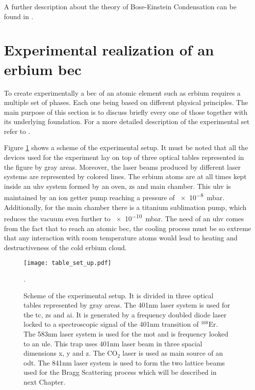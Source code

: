 A further description about the theory of Bose-Einstein Condensation can be found in \cite{Masahito2010, Pethick2008}.

\section{Experimental realization of an erbium \ac{bec}} \label{sec:experimental_preparation}

To create experimentally a \ac{bec} of an atomic element such as erbium requires a multiple set of phases. Each one being based on different physical principles. The main purpose of this section is to discuss briefly every one of those together with its underlying foundation. For a more detailed description of the experimental set refer to  \cite{Ulitzsch2016}. 

Figure \ref{fig:table_set_up} shows a scheme of the experimental setup. It must be noted that all the devices used for the experiment lay on top of three optical tables represented in the figure by gray areas. Moreover, the laser beams produced by different laser systems are represented by colored lines. The erbium atoms are at all times kept inside an \ac{uhv} system formed by an oven, \ac{zs} and main chamber. This \ac{uhv} is maintained by an ion getter pump reaching a pressure of \SI{e-8}{\milli\bar}. Additionally, for the main chamber there is a titanium sublimation pump, which reduces the vacuum even further to \SI{e-10}{\milli\bar}. The need of an \ac{uhv} comes from the fact that to reach an atomic \ac{bec}, the cooling process must be so extreme that any interaction with room temperature atoms would lead to heating and destructiveness of the cold erbium cloud.


\begin{figure}[!htbp]\centering
	\texttt{[image: table\_set\_up.pdf]}
	\caption[Scheme of the experimental setup]{Scheme of the experimental setup. It is divided in three optical tables represented by gray areas. The 401nm laser system is used for the \acf{tc}, \acf{zs} and \acf{ai}. It is generated by a frequency doubled diode laser locked to a spectroscopic signal of the 401nm transition of $^{\text{168}}\text{Er}$. The 583nm laser system is used for the \acf{mot} and is frequency looked to an \acf{ule}. This trap uses 401nm laser beam in three spacial dimensions x, y and z. The $\text{CO}_{2}$ laser is used as main source of an \acf{odt}. The 841nm laser system is used to form the two lattice beams used for the Bragg Scattering process which will be described in next Chapter.}\label{fig:table_set_up}. 
\end{figure}

